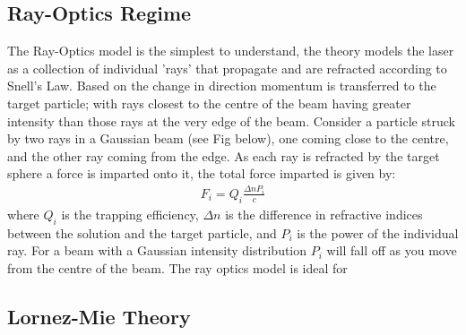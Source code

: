 \subsection{Ray-Optics Regime}

The Ray-Optics model is the simplest to understand, the theory models the laser as a collection of individual 'rays' that propagate and are refracted according to Snell's Law. Based on the change in direction momentum is transferred to the target particle; with rays closest to the centre of the beam having greater intensity than those rays at the very edge of the beam. Consider a particle struck by two rays in a Gaussian beam (see Fig below), one coming close to the centre, and the other ray coming from the edge. As each ray is refracted by the target sphere a force is imparted onto it, the total force imparted is given by:
\begin{align}
	F_i = Q_i\frac{\Delta n P_i}{c}
\end{align}
where $Q_i$ is the trapping efficiency, $\Delta n$ is the difference
in refractive indices between the solution and the target particle,
and $P_i$ is the power of the individual ray. For a beam with a
Gaussian intensity distribution $P_i$ will fall off as you move from
the centre of the beam.  The ray optics model is ideal for


\subsection{Lornez-Mie Theory}

